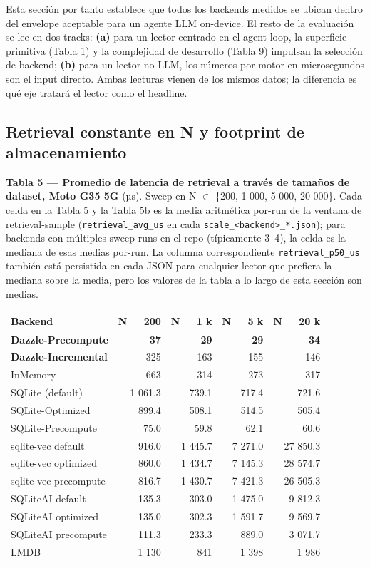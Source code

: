 Esta sección por tanto establece que todos los backends medidos se ubican dentro
del envelope aceptable para un agente LLM on-device. El resto de la evaluación
se lee en dos tracks: \textbf{(a)} para un lector centrado en el agent-loop, la
superficie primitiva (Tabla 1) y la complejidad de desarrollo (Tabla 9) impulsan
la selección de backend; \textbf{(b)} para un lector no-LLM, los números por
motor en microsegundos son el input directo. Ambas lecturas vienen de los mismos
datos; la diferencia es qué eje tratará el lector como el headline.

\subsection{Retrieval constante en N y footprint de
almacenamiento}\label{retrieval-constante-en-n-y-footprint-de-almacenamiento}

\textbf{Tabla 5 --- Promedio de latencia de retrieval a través de tamaños de
dataset, Moto G35 5G} (µs). Sweep en N \(\in\) \{200, 1 000, 5 000, 20 000\}.
Cada celda en la Tabla 5 y la Tabla 5b es la media aritmética por-run de la
ventana de retrieval-sample (\texttt{retrieval\_avg\_us} en cada
\texttt{scale\_\textless{}backend\textgreater{}\_*.json}); para backends con
múltiples sweep runs en el repo (típicamente 3--4), la celda es la mediana de
esas medias por-run. La columna correspondiente \texttt{retrieval\_p50\_us}
también está persistida en cada JSON para cualquier lector que prefiera la
mediana sobre la media, pero los valores de la tabla a lo largo de esta sección
son medias.

{\def\LTcaptype{none} %
\begin{longtable}[]{@{}lrrrr@{}}
\toprule\noalign{}
Backend & N = 200 & N = 1 k & N = 5 k & N = 20 k \\
\midrule\noalign{}
\endhead
\bottomrule\noalign{}
\endlastfoot
\textbf{Dazzle-Precompute} & \textbf{37} & \textbf{29} & \textbf{29} &
\textbf{34} \\
\textbf{Dazzle-Incremental} & 325 & 163 & 155 & 146 \\
InMemory & 663 & 314 & 273 & 317 \\
SQLite (default) & 1 061.3 & 739.1 & 717.4 & 721.6 \\
SQLite-Optimized & 899.4 & 508.1 & 514.5 & 505.4 \\
SQLite-Precompute & 75.0 & 59.8 & 62.1 & 60.6 \\
sqlite-vec default & 916.0 & 1 445.7 & 7 271.0 & 27 850.3 \\
sqlite-vec optimized & 860.0 & 1 434.7 & 7 145.3 & 28 574.7 \\
sqlite-vec precompute & 816.7 & 1 430.7 & 7 421.3 & 26 505.3 \\
SQLiteAI default & 135.3 & 303.0 & 1 475.0 & 9 812.3 \\
SQLiteAI optimized & 135.0 & 302.3 & 1 591.7 & 9 569.7 \\
SQLiteAI precompute & 111.3 & 233.3 & 889.0 & 3 071.7 \\
LMDB & 1 130 & 841 & 1 398 & 1 986 \\
\end{longtable}
}

